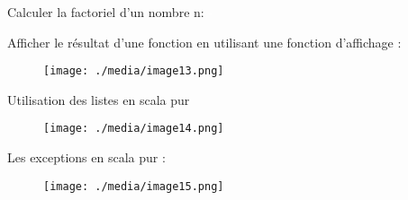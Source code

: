 \documentclass[12pt]{article}
\begin{document}
\begin{enumerate}

Calculer la factoriel d’un nombre n:\textcolor[HTML]{FFFFFF}{ -}\par


\vspace{\baselineskip}
\setlength{\parskip}{0.0pt}
\setlength{\parskip}{8.04pt}
Afficher le résultat d’une fonction en utilisant une fonction d’affichage :\par




\begin{figure}[H]
	\begin{FlushLeft}		\texttt{[image: ./media/image13.png]}
	\end{FlushLeft}\end{figure}



\setlength{\parskip}{0.0pt}
\par

\setlength{\parskip}{8.04pt}
Utilisation des listes en scala pur\par




\begin{figure}[H]
	\begin{FlushLeft}		\texttt{[image: ./media/image14.png]}
	\end{FlushLeft}\end{figure}



\setlength{\parskip}{0.0pt}
\par


\vspace{\baselineskip}
\setlength{\parskip}{8.04pt}
Les exceptions en scala pur :\par




\begin{figure}[H]
	\begin{Center}
		\texttt{[image: ./media/image15.png]}
	\end{Center}
\end{figure}



\end{enumerate}
\end{document}
